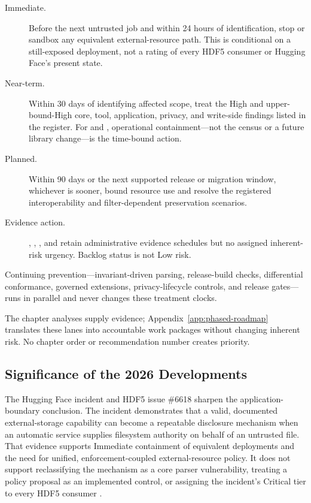 \documentclass[../main.tex]{subfiles}
\begin{document}
\begin{description}
    \item[Immediate.] Before the next untrusted job and within 24 hours of
    identification, stop or sandbox any equivalent 
    external-resource path. This is conditional on a still-exposed deployment,
    not a rating of every HDF5 consumer or Hugging Face's present state.

    \item[Near-term.] Within 30 days of identifying affected scope, treat the
    High and upper-bound-High core, tool, application, privacy, and write-side
    findings listed in the register. For  and
    ,  operational containment---not the
     census or a future library change---is the time-bound action.

    \item[Planned.] Within 90 days or the next supported release or migration
    window, whichever is sooner, bound resource use and resolve the registered
    interoperability and filter-dependent preservation scenarios.

    \item[Evidence action.] , ,
    , and  retain administrative evidence
    schedules but no assigned inherent-risk urgency. Backlog status is not Low
    risk.
\end{description}

Continuing prevention---invariant-driven parsing, release-build checks,
differential conformance, governed extensions, privacy-lifecycle controls, and
release gates---runs in parallel and never changes these treatment clocks.

The chapter analyses supply evidence; Appendix~\ref{app:phased-roadmap}
translates these lanes into accountable work packages without changing
inherent risk. No chapter order or recommendation number creates priority.

\subsection{Significance of the 2026 Developments}

The Hugging Face incident and HDF5 issue \#6618 sharpen the application-boundary
conclusion. The incident demonstrates that a valid, documented external-storage
capability can become a repeatable disclosure mechanism when an automatic
service supplies filesystem authority on behalf of an untrusted file. That
evidence supports Immediate containment of equivalent deployments and the need
for unified, enforcement-coupled external-resource policy. It does not support
reclassifying the mechanism as a core parser vulnerability, treating a policy
proposal as an implemented control, or assigning the incident's Critical tier
to every HDF5 consumer
\cite{huggingface-agent-intrusion-2026,
hdfgroup-mechanism-not-vulnerability-2026,h5py-gh-issue-2891,
hdf5-gh-issue-6618}.
\end{document}
